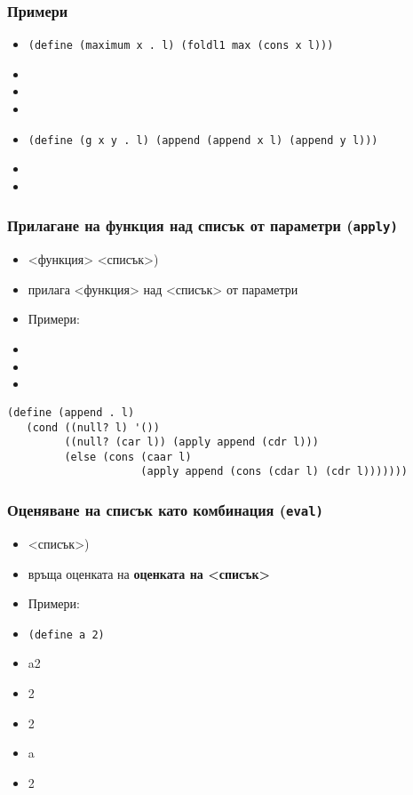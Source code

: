 \documentclass{beamer}
\begin{document}
\begin{frame}
  \frametitle{Примери}

  \begin{itemize}[<+->]
  \item \tt{(define (maximum x . l) (foldl1 max (cons x l)))}
  \item {}
  \item {}
  \item {}
  \item \tt{(define (g x y . l) (append (append x l) (append y l)))}
  \item {}
  \item {}
  \end{itemize}
\end{frame}

\begin{frame}[fragile]
  \frametitle{Прилагане на функция над списък от параметри (\tt{apply})}

  \begin{itemize}[<+->]
  \item {}<функция> <списък>\tta)
  \item прилага <функция> над <списък> от параметри
  \item Примери:
  \item {}
  \item {}
  \item {}
  \end{itemize}

  \onslide<+->
\small
\begin{verbatim}
(define (append . l)
   (cond ((null? l) '())
         ((null? (car l)) (apply append (cdr l)))
         (else (cons (caar l)
                     (apply append (cons (cdar l) (cdr l)))))))
\end{verbatim}
\end{frame}

\begin{frame}
  \frametitle{Оценяване на списък като комбинация (\tt{eval})}

  \begin{itemize}[<+->]
  \item {}<списък>\tta)
  \item връща оценката на \textbf{оценката на <списък>}
  \item Примери:
  \item \tt{(define a 2)}
  \item \evalsto a2
  \item {}2
  \item {}2
  \item {}a
  \item {}2
  \end{itemize}
\end{frame}
\end{document}

